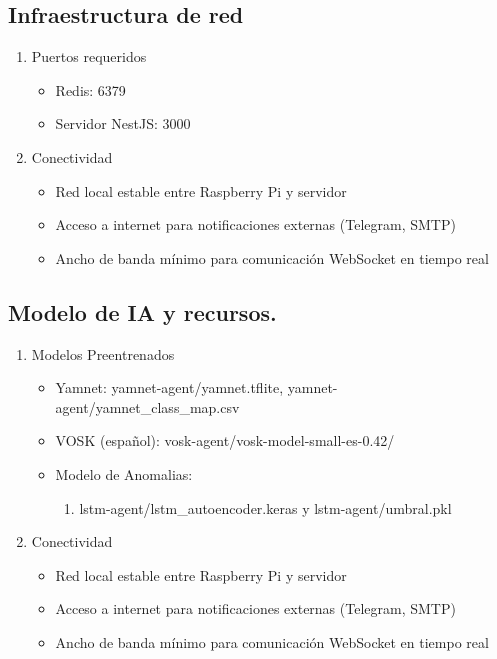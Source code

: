 \subsection*{Infraestructura de red}

\begin{enumerate}
  \item Puertos requeridos
        \begin{itemize}
          \item Redis: 6379
          \item Servidor NestJS: 3000
        \end{itemize}
  \item Conectividad
        \begin{itemize}
          \item Red local estable entre Raspberry Pi y servidor
          \item Acceso a internet para notificaciones externas (Telegram, SMTP)
          \item Ancho de banda mínimo para comunicación WebSocket en tiempo real
        \end{itemize}
\end{enumerate}

\subsection*{Modelo de IA y recursos.}

\begin{enumerate}
  \item Modelos Preentrenados
        \begin{itemize}
          \item Yamnet: yamnet-agent/yamnet.tflite, yamnet-agent/yamnet\_class\_map.csv
          \item VOSK (español): vosk-agent/vosk-model-small-es-0.42/
          \item Modelo de Anomalias:
                \begin{enumerate}
                  \item lstm-agent/lstm\_autoencoder.keras y lstm-agent/umbral.pkl
                \end{enumerate}
        \end{itemize}
  \item Conectividad
        \begin{itemize}
          \item Red local estable entre Raspberry Pi y servidor
          \item Acceso a internet para notificaciones externas (Telegram, SMTP)
          \item Ancho de banda mínimo para comunicación WebSocket en tiempo real
        \end{itemize}
\end{enumerate}

